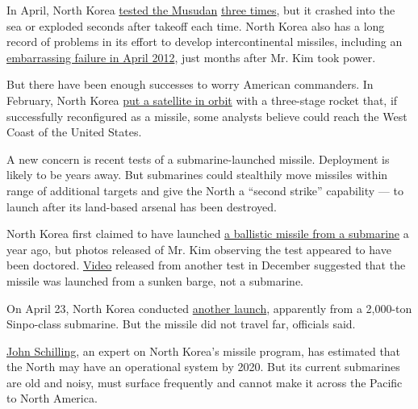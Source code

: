 In April, North Korea
\href{http://www.nytimes3xbfgragh.onion/2016/04/15/world/asia/north-korea-ballistic-missile-launch-a-failure-pentagon-says.html}{tested
the Musudan}
\href{http://www.nytimes3xbfgragh.onion/2016/04/29/world/asia/north-korea-missile-test.html}{three
times}, but it crashed into the sea or exploded seconds after takeoff
each time. North Korea also has a long record of problems in its effort
to develop intercontinental missiles, including an
\href{http://www.nytimes3xbfgragh.onion/2012/04/13/world/asia/north-korea-launches-rocket-defying-world-warnings.html}{embarrassing
failure in April 2012}, just months after Mr. Kim took power.

But there have been enough successes to worry American commanders. In
February, North Korea
\href{http://www.nytimes3xbfgragh.onion/2016/02/07/world/asia/north-korea-moves-up-rocket-launching-plan.html}{put
a satellite in orbit} with a three-stage rocket that, if successfully
reconfigured as a missile, some analysts believe could reach the West
Coast of the United States.

A new concern is recent tests of a submarine-launched missile.
Deployment is likely to be years away. But submarines could stealthily
move missiles within range of additional targets and give the North a
``second strike'' capability --- to launch after its land-based arsenal
has been destroyed.

North Korea first claimed to have launched
\href{http://www.nytimes3xbfgragh.onion/2015/05/09/world/asia/north-korea-says-it-test-fired-missile-from-submarine.html}{a
ballistic missile from a submarine} a year ago, but photos released of
Mr. Kim observing the test appeared to have been doctored.
\href{http://www.nytimes3xbfgragh.onion/2016/01/13/world/asia/north-korea-faked-test-video-group-says.html}{Video}
released from another test in December suggested that the missile was
launched from a sunken barge, not a submarine.

On April 23, North Korea conducted
\href{http://www.nytimes3xbfgragh.onion/2016/04/24/world/asia/north-korea-fires-ballistic-missile-from-submarine-south-says.html}{another
launch}, apparently from a 2,000-ton Sinpo-class submarine. But the
missile did not travel far, officials said.

\href{http://38north.org/author/john-schilling/}{John Schilling}, an
expert on North Korea's missile program, has estimated that the North
may have an operational system by 2020. But its current submarines are
old and noisy, must surface frequently and cannot make it across the
Pacific to North America.


